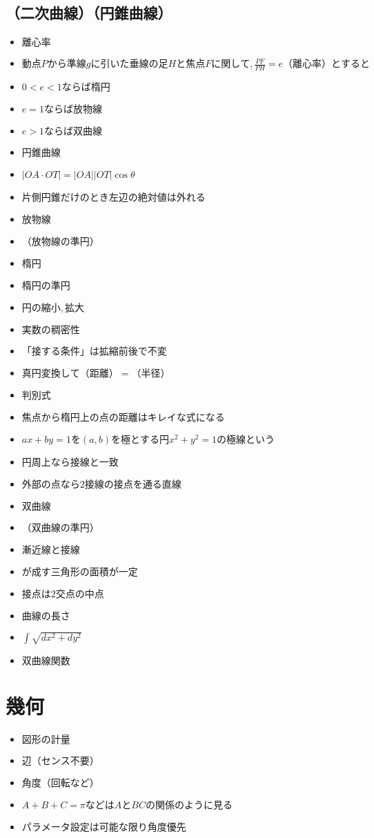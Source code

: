 \documentclass[dvipdfmx,uplatex]{jsarticle}
\begin{document}
\subsection{（二次曲線）（円錐曲線）}
\begin{itemize}
	\item $ 離心率$
		\item $ 動点Pから準線gに引いた垂線の足Hと焦点Fに関して,\frac{PF}{PH} = e（離心率）とすると$
			\item $ 0 < e < 1ならば楕円$
			\item $ e = 1 ならば放物線$
			\item $ e > 1 ならば双曲線  $
	\item $ 円錐曲線$
		\item $ |OA \cdot OT| = |OA||OT| \cos \theta$
			\item $ 片側円錐だけのとき左辺の絶対値は外れる$
	\item $ 放物線$
		\item $ （放物線の準円）$
	\item $ 楕円$
		\item $ 楕円の準円$
		\item $ 円の縮小,拡大$
			\item $ 実数の稠密性$
			\item $ 「接する条件」は拡縮前後で不変$
				\item $ 真円変換して（距離） = （半径）$
				\item $ 判別式$
		\item $ 焦点から楕円上の点の距離はキレイな式になる$
		\item $ ax + by = 1を(a,b)を極とする円x^2+y^2=1の極線という$
			\item $ 円周上なら接線と一致$
			\item $ 外部の点なら2接線の接点を通る直線$
	\item $ 双曲線$
	\item $ （双曲線の準円）$
	\item $ 漸近線と接線$
		\item $ が成す三角形の面積が一定$
		\item $ 接点は2交点の中点$
	\item $ 曲線の長さ$
		\item $ \int \sqrt{dx^2 + dy^2}$
		\item $ 双曲線関数$
\end{itemize}

\section{幾何}
\begin{itemize}
	\item $ 図形の計量$
		\item $ 辺（センス不要）$
		\item $ 角度（回転など）$
			\item $ A+B+C= \pi などはAとBCの関係のように見る$
		\item $ パラメータ設定は可能な限り角度優先$
\end{itemize}
\end{document}
